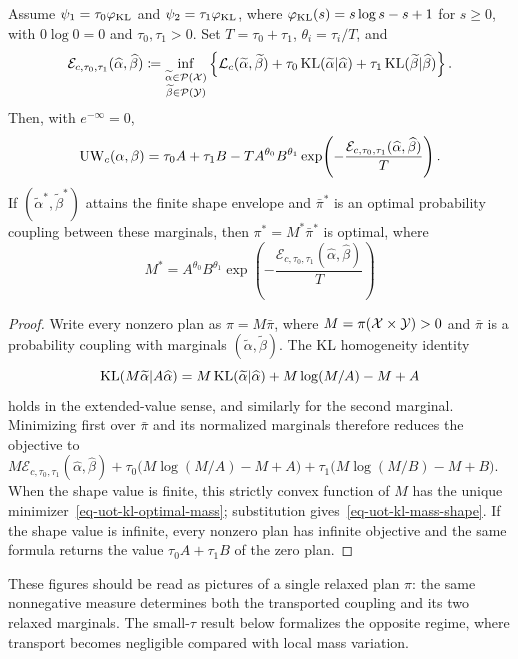 \begin{prop}\label{prop-uot-kl-mass-shape}
Assume $\psi_1=\tau_0\varphi_{\operatorname{KL}}$ and $\psi_2=\tau_1\varphi_{\operatorname{KL}}$, where $\varphi_{\operatorname{KL}}(s)=s\log s-s+1$ for $s\geq0$, with $0\log0=0$ and $\tau_0,\tau_1>0$. Set $T=\tau_0+\tau_1$, $\theta_i=\tau_i/T$, and
\begin{equation}\label{eq-uot-kl-shape-envelope}
\mathcal E_{c,\tau_0,\tau_1}(\widehat\alpha,\widehat\beta)
\coloneqq
\inf_{\substack{\widetilde\alpha\in\mathcal{P}(\mathcal{X})\\
\widetilde\beta\in\mathcal{P}(\mathcal{Y})}}
\left\{
\mathcal{L}_c(\widetilde\alpha,\widetilde\beta)
+\tau_0\operatorname{KL}(\widetilde\alpha|\widehat\alpha)
+\tau_1\operatorname{KL}(\widetilde\beta|\widehat\beta)
\right\}.
\end{equation}
Then, with $e^{-\infty}=0$,
\begin{equation}\label{eq-uot-kl-mass-shape}
\operatorname{UW}_c(\alpha,\beta)
=
\tau_0A+\tau_1B
-T A^{\theta_0}B^{\theta_1}
\exp\!\left(
-\frac{\mathcal E_{c,\tau_0,\tau_1}(\widehat\alpha,\widehat\beta)}{T}
\right).
\end{equation}
If $(\widetilde\alpha^*,\widetilde\beta^*)$ attains the finite shape envelope and $\bar\pi^*$ is an optimal probability coupling between these marginals, then $\pi^*=M^*\bar\pi^*$ is optimal, where
\begin{equation}\label{eq-uot-kl-optimal-mass}
M^*
=
A^{\theta_0}B^{\theta_1}
\exp\!\left(
-\frac{\mathcal E_{c,\tau_0,\tau_1}(\widehat\alpha,\widehat\beta)}{T}
\right)
\end{equation}
\end{prop}
\begin{proof}
Write every nonzero plan as $\pi=M\bar\pi$, where $M=\pi(\mathcal{X}\times\mathcal{Y})>0$ and $\bar\pi$ is a probability coupling with marginals $(\widetilde\alpha,\widetilde\beta)$. The KL homogeneity identity
\begin{equation}\label{eq-kl-mass-shape-identity}
\operatorname{KL}(M\widetilde\alpha|A\widehat\alpha)
=
M\operatorname{KL}(\widetilde\alpha|\widehat\alpha)
+M\log(M/A)-M+A
\end{equation}
holds in the extended-value sense, and similarly for the second marginal. Minimizing first over $\bar\pi$ and its normalized marginals therefore reduces the objective to
\(M\mathcal E_{c,\tau_0,\tau_1}(\widehat\alpha,\widehat\beta) +\tau_0\big(M\log(M/A)-M+A\big) +\tau_1\big(M\log(M/B)-M+B\big).\)
When the shape value is finite, this strictly convex function of $M$ has the unique minimizer~\eqref{eq-uot-kl-optimal-mass}; substitution gives~\eqref{eq-uot-kl-mass-shape}. If the shape value is infinite, every nonzero plan has infinite objective and the same formula returns the value $\tau_0A+\tau_1B$ of the zero plan.
\end{proof}
These figures should be read as pictures of a single relaxed plan $\pi$: the same nonnegative measure determines both the transported coupling and its two relaxed marginals. The small-$\tau$ result below formalizes the opposite regime, where transport becomes negligible compared with local mass variation.

